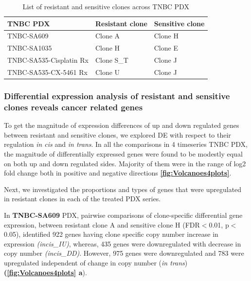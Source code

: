  \begin{table}[htbp]
   
   \centering
   \caption{List of resistant and sensitive clones across TNBC PDX}
     \begin{tabular}{|l|l|l|}
      \hline
     TNBC PDX & Resistant clone & Sensitive clone \\
     \hline
     TNBC-SA609  & Clone A & Clone H \\
     TNBC-SA1035 & Clone H & Clone E \\
     TNBC-SA535-Cisplatin Rx & Clone S\_T & Clone J \\
     TNBC-SA535-CX-5461 Rx & Clone U & Clone J \\  
     \hline
     \end{tabular}%
   \label{tab:Listofresistantandsensitiveclones}%
   
 \end{table}%


\subsubsection{Differential expression analysis of resistant and sensitive clones reveals cancer related genes}
 
 To get the magnitude of expression differences of up and down regulated genes between resistant and sensitive clones, we explored \ac{DE} with respect to their regulation \textit{in cis} and \textit{in trans}. In all the comparisons in 4 timeseries TNBC PDX, the magnitude of differentially expressed genes were found to be modestly equal on both up and down regulated sides. Majority of them were in the range of log2 fold change both in positive and negative directions \textbf{\autoref{fig:Volcanoes4plots}}.
 
 Next, we investigated the proportions and types of genes that were upregulated in resistant clones in each of the treated PDX series.
 
 In \textbf{TNBC-SA609} PDX, pairwise comparisons of clone-specific differential gene expression, between resistant clone A and sensitive clone H (FDR$<$0.01, p$<$0.05), identified 922 genes having clone specific copy number increase in expression \textit{(incis\_IU)}, whereas, 435 genes were downregulated with decrease in copy number \textit{(incis\_DD)}. However, 975 genes were downregulated and 783 were upregulated independent of change in copy number (\textit{in trans}) \textbf{(\autoref{fig:Volcanoes4plots} a}). 
 

